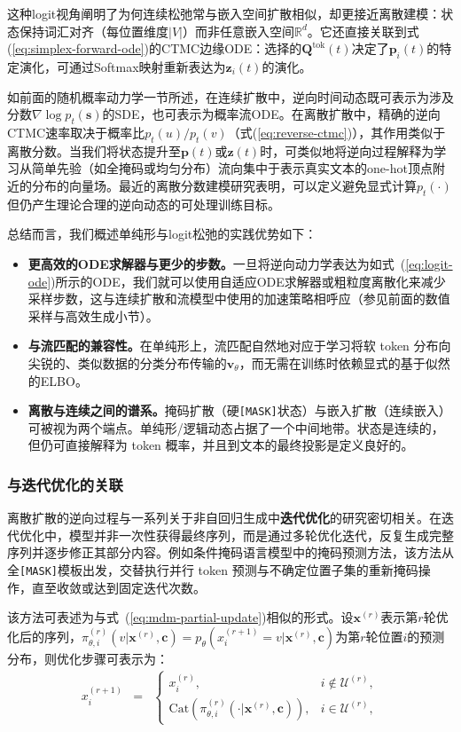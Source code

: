这种logit视角阐明了为何连续松弛常与嵌入空间扩散相似，却更接近离散建模：状态保持词汇对齐（每位置维度$|V|$）而非任意嵌入空间$\mathbb{R}^d$。它还直接关联到式(\ref{eq:simplex-forward-ode})的CTMC边缘ODE：选择的$\mathbf{Q}^{\mathrm{tok}}(t)$决定了$\mathbf{p}_i(t)$的特定演化，可通过Softmax映射重新表达为$\mathbf{z}_i(t)$的演化。

如前面的随机概率动力学一节所述，在连续扩散中，逆向时间动态既可表示为涉及分数$\nabla \log p_t(\mathbf{s})$的SDE，也可表示为概率流ODE。在离散扩散中，精确的逆向CTMC速率取决于概率比$p_t(u)/p_t(v)$（式(\ref{eq:reverse-ctmc})），其作用类似于离散分数。当我们将状态提升至$\mathbf{p}(t)$或$\mathbf{z}(t)$时，可类似地将逆向过程解释为学习从简单先验（如全掩码或均匀分布）流向集中于表示真实文本的one-hot顶点附近的分布的向量场。最近的离散分数建模研究表明，可以定义避免显式计算$p_t(\cdot)$但仍产生理论合理的逆向动态的可处理训练目标\citep{hoogeboom-etal:2021argmax,lou-etal:2024discrete}。

总结而言，我们概述单纯形与logit松弛的实践优势如下：
\begin{itemize}
\item \textbf{更高效的ODE求解器与更少的步数。}一旦将逆向动力学表达为如式~(\ref{eq:logit-ode})所示的ODE，我们就可以使用自适应ODE求解器或粗粒度离散化来减少采样步数，这与连续扩散和流模型中使用的加速策略相呼应（参见前面的数值采样与高效生成小节）。
\item \textbf{与流匹配的兼容性。}在单纯形上，流匹配自然地对应于学习将软 token 分布向尖锐的、类似数据的分类分布传输的$\mathbf{v}_\theta$，而无需在训练时依赖显式的基于似然的ELBO。
\item \textbf{离散与连续之间的谱系。}掩码扩散（硬\texttt{[MASK]}状态）与嵌入扩散（连续嵌入）可被视为两个端点。单纯形/逻辑动态占据了一个中间地带。状态是连续的，但仍可直接解释为 token 概率，并且到文本的最终投影是定义良好的。
\end{itemize}
\subsubsection{与迭代优化的关联}

离散扩散的逆向过程与一系列关于非自回归生成中\textbf{迭代优化}的研究密切相关\citep{lee-etal:2018deterministic}。在迭代优化中，模型并非一次性获得最终序列，而是通过多轮优化迭代，反复生成完整序列并逐步修正其部分内容。例如条件掩码语言模型中的掩码预测方法，该方法从全\texttt{[MASK]}模板出发，交替执行并行 token 预测与不确定位置子集的重新掩码操作，直至收敛或达到固定迭代次数\citep{ghazvininejad-etal:2019mask}。

该方法可表述为与式~(\ref{eq:mdm-partial-update})相似的形式。设$\mathbf{x}^{(r)}$表示第$r$轮优化后的序列，$\pi_{\theta,i}^{(r)}(v | \mathbf{x}^{(r)},\mathbf{c})=p_{\theta}(x_i^{(r+1)} = v | \mathbf{x}^{(r)},\mathbf{c})$为第$r$轮位置$i$的预测分布，则优化步骤可表示为：
\begin{eqnarray}
x_i^{(r+1)} & = &
\begin{cases}
x_i^{(r)}, & i\notin \mathcal{U}^{(r)},\\
\mathrm{Cat}\left(\pi^{(r)}_{\theta,i}(\cdot | \mathbf{x}^{(r)},\mathbf{c})\right), & i\in \mathcal{U}^{(r)},
\end{cases}
\label{eq:iterref-update}
\end{eqnarray}

